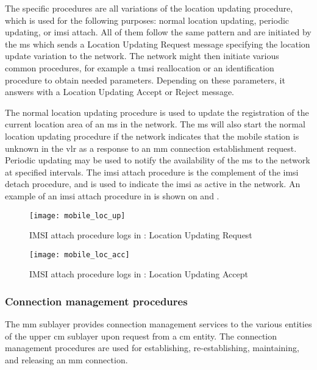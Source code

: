     The specific procedures are all variations of the location updating
    procedure, which is used for the following purposes: normal location
    updating, periodic updating, or \gls{imsi} attach. All of them
    follow the same pattern and are initiated by the \gls{ms} which
    sends a Location Updating Request message specifying the location
    update variation to the network. The network might then initiate
    various common procedures, for example a \gls{tmsi} reallocation or
    an identification procedure to obtain needed parameters. Depending
    on these parameters, it answers with a Location Updating Accept or
    Reject message.

    The normal location updating procedure is used to update the
    registration of the current location area of an \gls{ms} in the
  network. The \gls{ms} will also start the normal location updating
  procedure if the network indicates that the mobile station is
  unknown in the \gls{vlr} as a response to an \gls{mm} connection
  establishment request. Periodic updating may be used to notify the
  availability of the \gls{ms} to the network at specified intervals.
  The \gls{imsi} attach procedure is the complement of the \gls{imsi}
  detach procedure, and is used to indicate the \gls{imsi} as active
  in the network. An example of an \gls{imsi} attach procedure in
   is shown on  and
  .

    \begin{figure}
      \centering
      \texttt{[image: mobile\_loc\_up]}
      \caption{IMSI attach procedure logs in : Location
      Updating Request}
      \label{fig:mobile_loc_up}
    \end{figure}

    \begin{figure}
      \centering
      \texttt{[image: mobile\_loc\_acc]}
      \caption{IMSI attach procedure logs in : Location
      Updating Accept}
      \label{fig:mobile_loc_acc}
    \end{figure}

  \subsubsection{Connection management procedures}

  The \gls{mm} sublayer provides connection management services to the
  various entities of the upper \gls{cm} sublayer upon request from a
  \gls{cm} entity. The connection management procedures are used for
  establishing, re-establishing, maintaining, and releasing an
  \gls{mm} connection.

